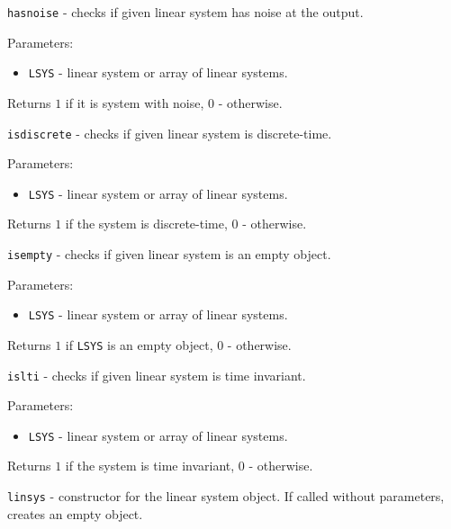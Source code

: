 \documentclass{report}
\begin{document}
\newpage

{\Large {\tt hasnoise}} - checks if given linear system has noise at the
output.

Parameters:
\begin{itemize}
\item {\tt LSYS} - linear system or array of linear systems.
\end{itemize}

Returns $1$ if it is system with noise, $0$ - otherwise.

\newpage

{\Large {\tt isdiscrete}} - checks if given linear system is discrete-time.

Parameters:
\begin{itemize}
\item {\tt LSYS} - linear system or array of linear systems.
\end{itemize}

Returns $1$ if the system is discrete-time, $0$ - otherwise.

\newpage

{\Large {\tt isempty}} - checks if given linear system is an empty object.

Parameters:
\begin{itemize}
\item {\tt LSYS} - linear system or array of linear systems.
\end{itemize}

Returns $1$ if {\tt LSYS} is an empty object, $0$ - otherwise.

\newpage

{\Large {\tt islti}} - checks if given linear system is time invariant.

Parameters:
\begin{itemize}
\item {\tt LSYS} - linear system or array of linear systems.
\end{itemize}

Returns $1$ if the system is time invariant, $0$ - otherwise.

\newpage

{\Large {\tt linsys}} - constructor for the linear system object.
If called without parameters, creates an empty object.
\end{document}
